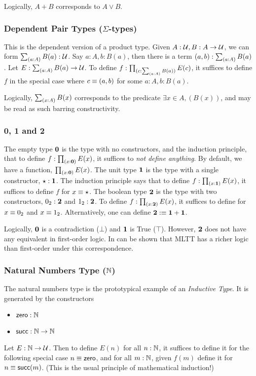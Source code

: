 Logically, $A + B$ corresponds to $ A \lor B$.

\subsubsection{Dependent Pair Types ($\Sigma$-types)}
This is the dependent version of a product type. Given $A : \mathcal{U}, B : A \to \mathcal{U}$, we can form $\sum_{(a:A)}{B(a)} : \mathcal{U}$.
Say $a : A, b : B(a)$, then there is a term $(a,b) : \sum_{(a:A)}{B(a)}$. 
Let $E : \sum_{(a:A)}{B(a)} \to \mathcal{U}$. To define $f : \prod_{(c:\sum_{(a:A)}{B(a)})}{E(c)}$, it suffices to define
$f$ in the special case where $c \equiv (a,b)$ for some $a : A, b : B(a)$.

Logically, $\sum_{(x:A)}{B(x)}$ corresponds to the predicate $\exists x \in A, (B(x))$, and may be read as such barring constructivity.

\subsubsection{0, 1 and 2}
The empty type $\mathbf{0}$ is the type with no constructors, and the induction principle, that to define
$f : \prod_{(x:\mathbf{0})}{E(x)}$, it suffices to \textit{not define anything}. By default, we have a function,
$\prod_{(x:\mathbf{0})}{E(x)}$.
The unit type $\mathbf{1}$ is the type with a single constructor, $\star : \mathbf{1}$. The induction principle says that
to define $f : \prod_{(x:\mathbf{1})}{E(x)}$, it suffices to define $f$ for $x \equiv \star$.
The boolean type $\mathbf{2}$ is the type with two constructors, $0_2 : \mathbf{2}$ and $1_2 : \mathbf{2}$. To define 
$f : \prod_{(x:\mathbf{2})}{E(x)}$, it suffices to define for $x \equiv 0_2$ and $x \equiv 1_2$.
Alternatively, one can define $\mathbf{2} :\equiv \mathbf{1} + \mathbf{1}$.

Logically, $\mathbf{0}$ is a contradiction ($\bot$) and $\mathbf{1}$ is True ($\top$).
However, $\mathbf{2}$ does not have any equivalent in first-order logic. In can be shown that MLTT has a richer logic than first-order under this
correspondence.~\cite{HoTT}

\subsubsection{Natural Numbers Type ($\mathbb{N}$)}
The natural numbers type is the prototypical example of an \textit{Inductive Type}. It is generated by the constructors
\begin{itemize}
  \item $\mathsf{zero} : \mathbb{N}$
  \item $\mathsf{succ} : \mathbb{N} \to \mathbb{N}$
\end{itemize}
Let $E : \mathbb{N} \to \mathcal{U}$. Then to define $E(n)$ for all $n: \mathbb{N}$, it suffices to define it for the following special case 
$n \equiv \mathsf{zero}$, and for all $m : \mathbb{N}$, given $f(m)$ define it for $n \equiv \mathsf{succ}(m)$.
(This is the usual principle of mathematical induction!)

